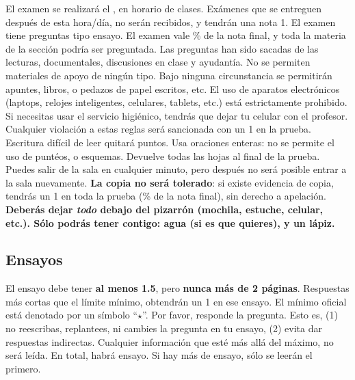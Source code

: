 \documentclass{article}
\begin{document}
El examen se realizar\'a el \underline{{\unskip}}, en horario de clases. Ex\'amenes que se entreguen despu\'es de esta hora/d\'ia, no ser\'an recibidos, y tendr\'an una nota 1. El examen tiene {\unskip} preguntas tipo ensayo. El examen vale {\unskip}\% de la nota final, y toda la materia de la secci\'on podr\'ia ser preguntada. Las preguntas han sido sacadas de las lecturas, documentales, discusiones en clase y ayudant\'ia. No se permiten materiales de apoyo de ning\'un tipo. Bajo ninguna circunstancia se permitir\'an apuntes, libros, o pedazos de papel escritos, etc. El uso de aparatos electr\'onicos (laptops, relojes inteligentes, celulares, tablets, etc.) est\'a estrictamente prohibido. Si necesitas usar el servicio higi\'enico, tendr\'as que dejar tu celular con el profesor. Cualquier violaci\'on a estas reglas ser\'a sancionada con un 1 en la prueba.  Escritura dif\'icil de leer quitar\'a puntos. Usa oraciones enteras: no se permite el uso de punt\'eos, o esquemas. Devuelve todas las hojas al final de la prueba. Puedes salir de la sala en cualquier minuto, pero despu\'es no ser\'a posible entrar a la sala nuevamente. {\bf La copia no ser\'a tolerado}: si existe evidencia de copia, tendr\'as un 1 en toda la prueba ({\unskip}\% de la nota final), sin derecho a apelaci\'on. {\bf Deber\'as dejar \emph{todo} debajo del pizarr\'on (mochila, estuche, celular, etc.). S\'olo podr\'as tener contigo: agua (si es que quieres), y un l\'apiz.}


 

\subsection*{Ensayos}

El ensayo debe tener {\bf al menos 1.5}, pero {\bf nunca m\'as de 2 p\'aginas}. Respuestas m\'as cortas que el l\'imite m\'inimo, obtendr\'an un 1 en ese ensayo. El m\'inimo oficial est\'a denotado por un s\'imbolo ``$\star$''. Por favor, responde la pregunta. Esto es, (1) no reescribas, replantees, ni cambies la pregunta en tu ensayo, (2) evita dar respuestas indirectas. Cualquier informaci\'on que est\'e m\'as all\'a del m\'aximo, no ser\'a le\'ida. En total, habr\'a {\unskip} ensayo. Si hay m\'as de {\unskip} ensayo, s\'olo se leer\'an el primero.%
\end{document}

